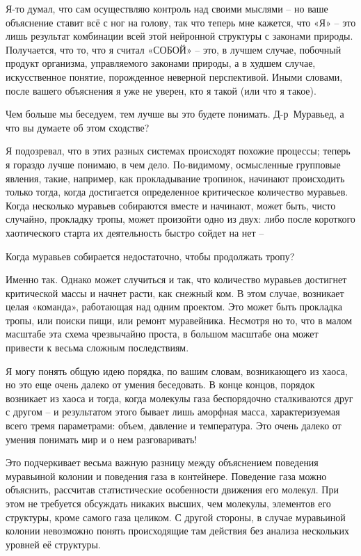 \documentclass[../main.tex]{subfiles}
\begin{document}
\begin{dialogue}
 Я-то думал, что сам осуществляю контроль над своими мыслями \--- но ваше объяснение ставит всё с ног на голову, так что теперь мне кажется, что «Я» \--- это лишь результат комбинации всей этой нейронной структуры с законами природы. Получается, что то, что я считал «СОБОЙ» \--- это, в лучшем случае, побочный продукт организма, управляемого законами природы, а в худшем случае, искусственное понятие, порожденное неверной перспективой. Иными словами, после вашего объяснения я уже не уверен, кто я такой (или что я такое).

 Чем больше мы беседуем, тем лучше вы это будете понимать. Д-р~Муравьед, а что вы думаете об этом сходстве?

 Я подозревал, что в этих разных системах происходят похожие процессы; теперь я гораздо лучше понимаю, в чем дело. По-видимому, осмысленные групповые явления, такие, например, как прокладывание тропинок, начинают происходить только тогда, когда достигается определенное критическое количество муравьев. Когда несколько муравьев собираются вместе и начинают, может быть, чисто случайно, прокладку тропы, может произойти одно из двух: либо после короткого хаотического старта их деятельность быстро сойдет на нет \---

 Когда муравьев собирается недостаточно, чтобы продолжать тропу?

 Именно так. Однако может случиться и так, что количество муравьев достигнет критической массы и начнет расти, как снежный ком. В этом случае, возникает целая «команда», работающая над одним проектом. Это может быть прокладка тропы, или поиски пищи, или ремонт муравейника. Несмотря но то, что в малом масштабе эта схема чрезвычайно проста, в большом масштабе она может привести к весьма сложным последствиям.

 Я могу понять общую идею порядка, по вашим словам, возникающего из хаоса, но это еще очень далеко от умения беседовать. В конце концов, порядок возникает из хаоса и тогда, когда молекулы газа беспорядочно сталкиваются друг с другом \--- и результатом этого бывает лишь аморфная масса, характеризуемая всего тремя параметрами: объем, давление и температура. Это очень далеко от умения понимать мир и о нем разговаривать!

 Это подчеркивает весьма важную разницу между объяснением поведения муравьиной колонии и поведения газа в контейнере. Поведение газа можно объяснить, рассчитав статистические особенности движения его молекул. При этом не требуется обсуждать никаких высших, чем молекулы, элементов его структуры, кроме самого газа целиком. С другой стороны, в случае муравьиной колонии невозможно понять происходящие там действия без анализа нескольких уровней её структуры.


\end{dialogue}
\end{document}
